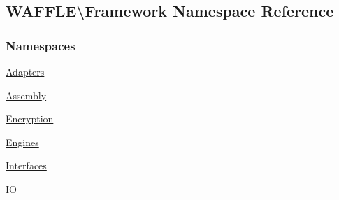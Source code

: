 \hypertarget{namespace_w_a_f_f_l_e_1_1_framework}{}\subsection{W\+A\+F\+F\+LE\textbackslash{}Framework Namespace Reference}
\label{namespace_w_a_f_f_l_e_1_1_framework}
\subsubsection*{Namespaces}
\begin{DoxyCompactItemize}
\item 
 \hyperlink{namespace_w_a_f_f_l_e_1_1_framework_1_1_adapters}{Adapters}
\item 
 \hyperlink{namespace_w_a_f_f_l_e_1_1_framework_1_1_assembly}{Assembly}
\item 
 \hyperlink{namespace_w_a_f_f_l_e_1_1_framework_1_1_encryption}{Encryption}
\item 
 \hyperlink{namespace_w_a_f_f_l_e_1_1_framework_1_1_engines}{Engines}
\item 
 \hyperlink{namespace_w_a_f_f_l_e_1_1_framework_1_1_interfaces}{Interfaces}
\item 
 \hyperlink{namespace_w_a_f_f_l_e_1_1_framework_1_1_i_o}{IO}
\end{DoxyCompactItemize}
